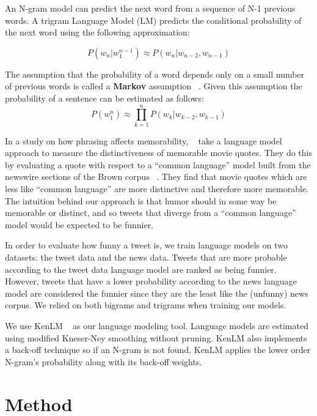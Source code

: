 \documentclass[11pt,a4paper]{article}
\begin{document}
An N-gram model can predict the next word from a sequence of N-1 previous words.
A trigram Language Model (LM) predicts the conditional probability of the next word using the following approximation:

\begin{equation}
P(w_n|w_1^{n-1})\approx P(w_n|w_{n-2}, w_{n-1})
\end{equation}

The assumption that the probability of a word depends only on a small number of previous words 
is called a \textbf{Markov} assumption ~\cite{markov1954theory}. Given this assumption 
the probability of a sentence can be estimated as follows:
\begin{equation}
P(w_1^n)\approx \prod_{k=1}^{n} P(w_k|w_{k-2}, w_{k-1})
\end{equation}
 
In a study on how phrasing affects memorability, ~\cite{hello} take a language model approach to measure the distinctiveness of
memorable movie quotes. They do this by evaluating a quote with respect to a ``common language'' model built from the newswire sections 
of the Brown corpus ~\cite{BC}. They find that movie quotes which are less like  ``common language'' are more distinctive and therefore
more memorable. The intuition behind our approach is that humor should in some way be memorable or distinct, and so tweets that 
diverge from a ``common language'' model would be expected to be funnier. 

In order to evaluate how funny a tweet is, we train language models on two datasets: 
the tweet data and the news data. 
Tweets that are more probable according to the tweet data language model 
are ranked as being funnier. However, tweets
that have a lower probability according to the news language 
model are considered the funnier since they are the least like the 
(unfunny) news corpus. We relied on both
bigrams and trigrams when training our models. 

We use KenLM ~\cite{Heafield-estimate} as our language modeling tool. Language models are estimated using modified Kneser-Ney smoothing 
without pruning. KenLM also implements a back-off technique so if an N-gram is not found, KenLM applies the lower order N-gram's probability 
along with its back-off weights. 

\section{Method}
\end{document}
